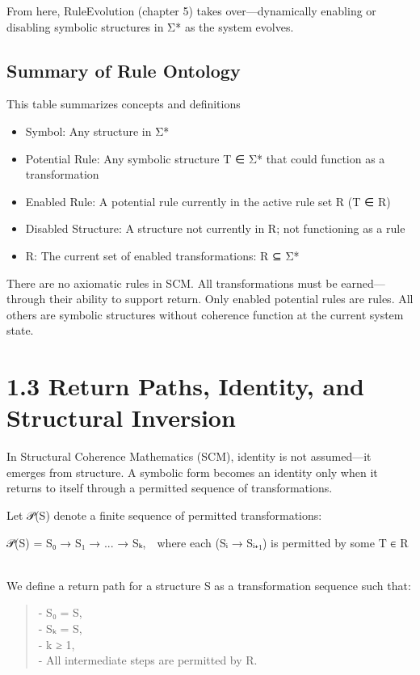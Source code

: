 From here, RuleEvolution (chapter 5) takes over---dynamically enabling
or disabling symbolic structures in Σ* as the system evolves.

\subsection{Summary of Rule Ontology}\label{summary-of-rule-ontology}

This table summarizes concepts and definitions

\begin{itemize}
\item
  Symbol: Any structure in Σ*
\item
  Potential Rule: Any symbolic structure T ∈ Σ* that could function as a
  transformation
\item
  Enabled Rule: A potential rule currently in the active rule set R (T ∈
  R)
\item
  Disabled Structure: A structure not currently in R; not functioning as
  a rule
\item
  R: The current set of enabled transformations: R ⊆ Σ*
\end{itemize}

There are no axiomatic rules in SCM. All transformations must be
earned---through their ability to support return. Only enabled potential
rules are rules. All others are symbolic structures without coherence
function at the current system state.

\section{1.3 \textbar{} Return Paths, Identity, and Structural
Inversion}\label{return-paths-identity-and-structural-inversion}

In Structural Coherence Mathematics (SCM), identity is not assumed---it
emerges from structure. A symbolic form becomes an identity only when it
returns to itself through a permitted sequence of transformations.

Let 𝒫(S) denote a finite sequence of permitted transformations:

𝒫(S) = S₀ → S₁ → ... → Sₖ, where each (Sᵢ → Sᵢ₊₁) is permitted by some T
∈ R\\
\strut \\
We define a return path for a structure S as a transformation sequence
such that:

\begin{quote}
- S₀ = S,\\
- Sₖ = S,\\
- k ≥ 1,\\
- All intermediate steps are permitted by R.
\end{quote}

